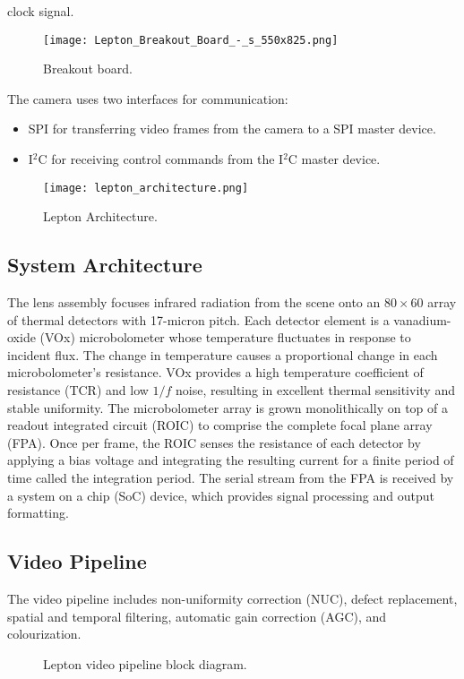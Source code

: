 clock signal.\cite{breakoutboard}
%
\begin{figure}[!htb]
    \centering
    \texttt{[image: Lepton\_Breakout\_Board\_-\_s\_550x825.png]}
    \caption{Breakout board.}
    \label{fig:breakoutboard}
 \end{figure}
\linebreak The camera uses two interfaces for communication:
\begin{itemize}
    \item SPI for transferring video frames from the camera to a SPI master
device.
    \item I$^{2}$C for receiving control commands from the I$^{2}$C master
device.
\end{itemize}
%
\begin{figure}[htb]
    \centering
    \texttt{[image: lepton\_architecture.png]}
    \caption{Lepton Architecture.}
    \label{fig:leptonarchitecture}
\end{figure}
%
\subsection{System Architecture}
\label{ssec:leptonarchitecture}
The lens assembly focuses infrared radiation from the scene onto an $80 \times 60$ array
of thermal detectors with 17-micron pitch. Each detector element is a
vanadium-oxide (VOx) microbolometer whose temperature fluctuates in response to
incident flux. The change in temperature causes a proportional change in each
microbolometer’s resistance. VOx provides a high temperature coefficient of
resistance (TCR) and low $1/f$ noise, resulting in excellent thermal sensitivity
and stable uniformity. The microbolometer array is grown monolithically on top
of a readout integrated circuit (ROIC) to comprise the complete focal plane
array (FPA). Once per frame, the ROIC senses the resistance of each detector by
applying a bias voltage and integrating the resulting current for a finite
period of time called the integration period. The serial stream from the FPA is
received by a system on a chip (SoC) device, which provides signal processing
and output formatting.
%
\subsection{Video Pipeline}
\label{ssec:pipeline}
The video pipeline includes non-uniformity correction (NUC), defect replacement,
spatial and temporal filtering, automatic gain correction (AGC), and
colourization.
%
\begin{figure}[!h]
    \centering
    \resizebox{0.65\textwidth}{!}{}
    \caption{Lepton video pipeline block diagram.}
    \label{fig:videopipe}
\end{figure}
